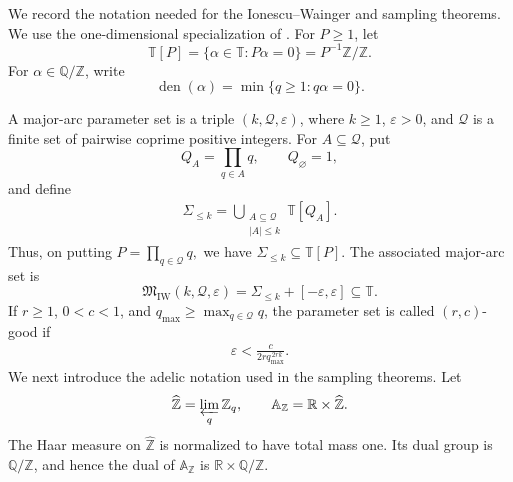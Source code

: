 \documentclass[12pt,reqno]{amsart}
\numberwithin{equation}{section}
\theoremstyle{definition}
\theoremstyle{remark}
\begin{document}
We record the notation needed for the Ionescu--Wainger and sampling
theorems.  We use the one-dimensional specialization of
\cite[Definition~1.3]{Tao2021}.
For \(P\geq1\), let
\[
 \mathbb T[P]
 =\{\alpha\in\mathbb T:P\alpha=0\}
 =P^{-1}\mathbb Z/\mathbb Z.
\]
For \(\alpha\in\mathbb Q/\mathbb Z\), write
\[
 \operatorname{den}(\alpha)
 =\min\{q\geq1:q\alpha=0\}.
\]

A major-arc parameter set is a triple
\((k,\mathcal Q,\varepsilon)\), where \(k\geq1\),
\(\varepsilon>0\), and \(\mathcal Q\) is a finite set of pairwise
coprime positive integers.  For \(A\subseteq\mathcal Q\), put
\[
 Q_A=\prod_{q\in A}q,
 \qquad Q_\varnothing=1,
\]
and define
\begin{align}\label{e:IWSigma}
 \Sigma_{\leq k}
 =
 \bigcup_{\substack{A\subseteq\mathcal Q\\|A|\leq k}}
 \mathbb T[Q_A].
\end{align}
Thus, on putting $ P=\prod_{q\in\mathcal Q}q,$
we have \(\Sigma_{\leq k}\subseteq\mathbb T[P]\).  The associated
major-arc set is
\[
 \mathfrak M_{\mathrm{IW}}(k,\mathcal Q,\varepsilon)
 =
 \Sigma_{\leq k}+[-\varepsilon,\varepsilon]
 \subseteq\mathbb T.
\]
If \(r\geq1\), \(0<c<1\), and
\(q_{\max}\geq\max_{q\in\mathcal Q}q\), the parameter set is called
\((r,c)\)-good if
\begin{align}\label{e:IWgood}
 \varepsilon<
 \frac{c}{2r q_{\max}^{\,2rk}}.
\end{align}
We next introduce the adelic notation used in the sampling theorems.
Let
\[
 \widehat{\mathbb Z}
 =\varprojlim_{q}\mathbb Z_q,
 \qquad
 \mathbb A_{\mathbb Z}
 =\mathbb R\times\widehat{\mathbb Z}.
\]
The Haar measure on \(\widehat{\mathbb Z}\) is normalized to have
total mass one.  Its dual group is \(\mathbb Q/\mathbb Z\), and hence
the dual of \(\mathbb A_{\mathbb Z}\) is
\(\mathbb R\times\mathbb Q/\mathbb Z\).
\end{document}
